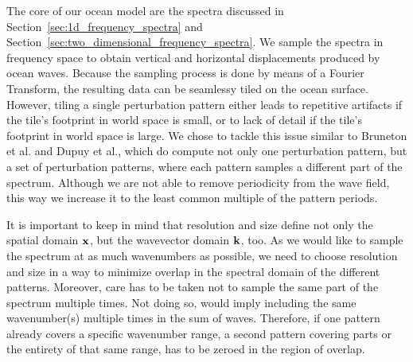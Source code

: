 The core of our ocean model are the spectra discussed in 
Section~\ref{sec:1d_frequency_spectra} and 
Section~\ref{sec:two_dimensional_frequency_spectra}. We sample the spectra in 
frequency space to obtain vertical and horizontal displacements produced by 
ocean waves. Because the sampling process is done by means of a Fourier 
Transform, the resulting data can be seamlessy tiled on the ocean surface. 
However, tiling a single perturbation pattern either leads to repetitive 
artifacts if the tile's footprint in world space is small, or to lack of detail 
if the tile's footprint in world space is large. We chose to tackle this 
issue similar to Bruneton et al.\cite{misc:oceanlightingfft} and Dupuy et 
al.\cite{article:whitecaps}, which do compute not only one perturbation 
pattern, but a set of perturbation patterns, where each pattern samples a 
different part of the spectrum. Although we are not able to remove periodicity 
from the wave field, this way we increase it to the least common multiple of 
the pattern periods.

It is important to keep in mind that resolution and size define not only the
spatial domain $\mathbf{x}$, but the wavevector domain $\mathbf{k}$, too. As we would
like to sample the spectrum at as much wavenumbers as possible, we need to
choose resolution and size in a way to minimize overlap in the spectral domain
of the different patterns. Moreover, care has to be taken not to sample the same
part of the spectrum multiple times. Not doing so, would imply including the
same wavenumber(s) multiple times in the sum of waves. Therefore, if one pattern
already covers a specific wavenumber range, a second pattern covering parts or
the entirety of that same range, has to be zeroed in the region of overlap.

